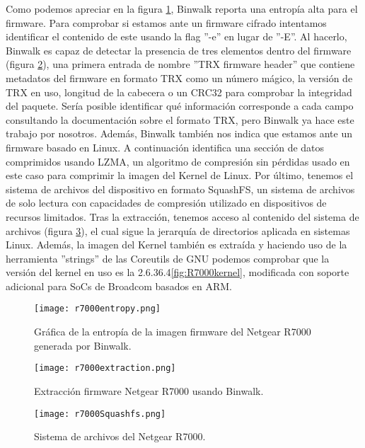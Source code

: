 Como podemos apreciar en la figura \ref{fig:binwalkEnt}, Binwalk reporta una entropía alta para el firmware. Para comprobar si estamos
ante un firmware cifrado intentamos identificar el contenido de este usando la flag ''-e'' en lugar de ''-E''. Al hacerlo, Binwalk es capaz de detectar 
la presencia de tres elementos dentro del firmware (figura \ref{fig:binwalkExt}), una primera entrada de nombre ''TRX firmware header'' que contiene metadatos
del firmware en formato TRX como un número mágico, la versión de TRX en uso, longitud de la cabecera o un CRC32 para comprobar la integridad del paquete. Sería posible
identificar qué información corresponde a cada campo consultando la documentación sobre el formato TRX\cite{firmwareFormat}, pero Binwalk ya hace este trabajo 
por nosotros. Además, Binwalk también nos indica que estamos ante un firmware basado en Linux. A continuación identifica una sección de datos comprimidos usando LZMA, un algoritmo
de compresión sin pérdidas usado en este caso para comprimir la imagen del Kernel de Linux. Por último, tenemos el sistema de archivos del dispositivo en formato
SquashFS, un sistema de archivos de solo lectura con capacidades de compresión utilizado en dispositivos de recursos limitados. Tras la extracción, tenemos acceso 
al contenido del sistema de archivos (figura \ref{fig:R7000squashfs}), el cual sigue la jerarquía de directorios aplicada en sistemas Linux. Además, la imagen 
del Kernel también es extraída y haciendo uso de la herramienta ''strings'' de las Coreutils de GNU podemos comprobar que la versión del kernel en uso es la 
2.6.36.4\ref{fig:R7000kernel}, modificada con soporte adicional para SoCs de Broadcom basados en ARM.

\begin{figure}[H]
    \centering
    \texttt{[image: r7000entropy.png]}
    \caption{Gráfica de la entropía de la imagen firmware del Netgear R7000 generada por Binwalk.}
    \label{fig:binwalkEnt}
\end{figure}

\begin{figure}[H]
    \centering
    \texttt{[image: r7000extraction.png]}
    \caption{Extracción firmware Netgear R7000 usando Binwalk.}
    \label{fig:binwalkExt}
\end{figure}

\begin{figure}[H]
    \centering
    \texttt{[image: r7000Squashfs.png]}
    \caption{Sistema de archivos del Netgear R7000.}
    \label{fig:R7000squashfs}
\end{figure}

